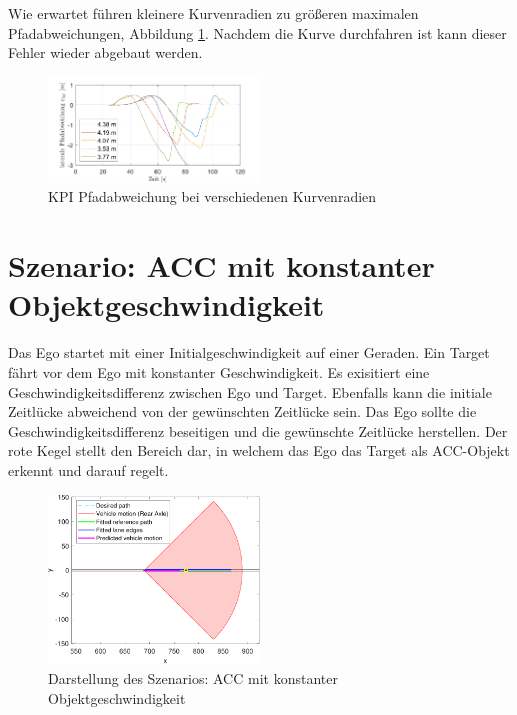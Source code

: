 \noindent Wie erwartet führen kleinere Kurvenradien zu größeren maximalen Pfadabweichungen, Abbildung \ref{fig:Curve_negative_s-Error}. Nachdem die Kurve durchfahren ist kann dieser Fehler wieder abgebaut werden.
\begin{figure}[ht]
    \centering
    \includegraphics[width=0.5\textwidth]{figures/3_Implementierung/Curve_negative/Curve_negative_s-Error.pdf}
    \caption{KPI Pfadabweichung bei verschiedenen Kurvenradien}
    \label{fig:Curve_negative_s-Error}
\end{figure}

\section{Szenario: ACC mit konstanter Objektgeschwindigkeit} \label{sec:acc_vel_const}
Das Ego startet mit einer Initialgeschwindigkeit auf einer Geraden. Ein Target fährt vor dem Ego mit konstanter Geschwindigkeit. Es exisitiert eine Geschwindigkeitsdifferenz zwischen Ego und Target. Ebenfalls kann die initiale Zeitlücke abweichend von der gewünschten Zeitlücke sein. Das Ego sollte die Geschwindigkeitsdifferenz beseitigen und die gewünschte Zeitlücke herstellen. Der rote Kegel stellt den Bereich dar, in welchem das Ego das Target als ACC-Objekt erkennt und darauf regelt. 
\begin{figure}[ht]
    \centering
    \includegraphics[width=0.5\textwidth]{figures/3_Implementierung/ACC_Vel_Const/test_ACC_Vel_Const_depiction.pdf}
    \caption{Darstellung des Szenarios: ACC mit konstanter Objektgeschwindigkeit}
    \label{fig:test_ACC_Vel_Const_depiction}
\end{figure}

